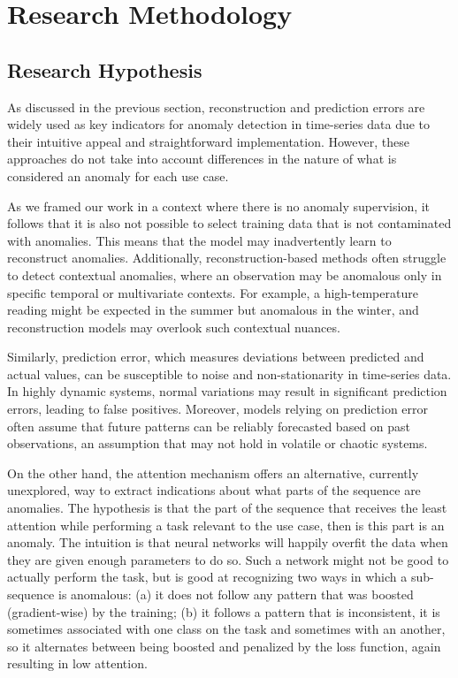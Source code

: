 \documentclass[conference]{IEEEtran}
\begin{document}
\section{Research Methodology}
\label{sec:method}

\subsection{Research Hypothesis}
\label{sec:method:hypothesis}

As discussed in the previous section, reconstruction and prediction
errors are widely used as key indicators for anomaly detection in
time-series data due to their intuitive appeal and straightforward
implementation. However, these approaches do not take into account
differences in the nature of what is considered an anomaly for each
use case.

As we framed our work in a context where there is no anomaly
supervision, it follows that it is also not possible to select
training data that is not contaminated with anomalies. This means that
the model may inadvertently learn to reconstruct anomalies.
Additionally, reconstruction-based methods often struggle to detect
contextual anomalies, where an observation may be anomalous only in
specific temporal or multivariate contexts. For example, a
high-temperature reading might be expected in the summer but anomalous
in the winter, and reconstruction models may overlook such contextual
nuances.

Similarly, prediction error, which measures deviations between
predicted and actual values, can be susceptible to noise and
non-stationarity in time-series data. In highly dynamic systems,
normal variations may result in significant prediction errors, leading
to false positives. Moreover, models relying on prediction error often
assume that future patterns can be reliably forecasted based on past
observations, an assumption that may not hold in volatile or chaotic
systems.

On the other hand, the attention mechanism offers an alternative,
currently unexplored, way to extract indications about what parts of
the sequence are anomalies. The hypothesis is that the part of the
sequence that receives the least attention while performing a task
relevant to the use case, then is this part is an anomaly. The
intuition is that neural networks will happily overfit the data
when they are given enough parameters to do so. Such a network might
not be good to actually perform the task, but is good at recognizing
two ways in which a sub-sequence is anomalous: (a) it does not follow
any pattern that was boosted (gradient-wise) by the training;
(b) it follows a pattern that is inconsistent, it is sometimes
associated with one class on the task and sometimes with an another,
so it alternates between being boosted and penalized by the loss
function, again resulting in low attention.
\end{document}
